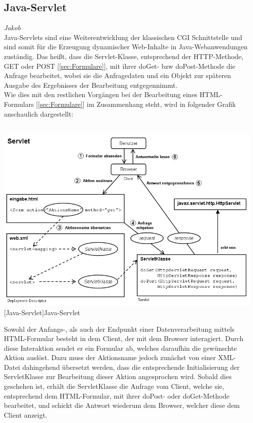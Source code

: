 \documentclass[12pt,a4paper,bibliography=totocnumbered,listof=totocnumbered]{scrartcl}
\begin{document}
\vspace{1em}
\begin{minipage}{\linewidth}
\subsection{Java-Servlet}
\label{sec:Java-Servlet}
\emph{Jakob}\\
Java-Servlets sind eine Weiterentwicklung der klassischen CGI Schnittstelle und sind somit für die Erzeugung dynamischer Web-Inhalte in Java-Webanwendungen zuständig.
Das heißt, dass die Servlet-Klasse, entsprechend der HTTP-Methode, GET oder POST [\ref{sec:Formulare}], mit ihrer doGet- bzw doPost-Methode die Anfrage bearbeitet, wobei sie die Anfragedaten und ein Objekt zur späteren Ausgabe des Ergebnisses der Bearbeitung entgegennimmt.\cite{wiki/Servlet}\\
Wie dies mit den restlichen Vorgängen bei der Bearbeitung eines HTML-Formulars [\ref{sec:Formulare}] im Zusammenhang steht, wird in folgender Grafik anschaulich dargestellt:\\
\\
\vspace{1em}
\begin{minipage}{\linewidth}
	\centering
	\includegraphics[width=0.9\linewidth]{Bilder/600px-Servlet.png}
	[Java-Servlet]{Java-Servlet\footnotemark }
	\label{fig:servlet}
\end{minipage}

Sowohl der Anfangs-, als auch der Endpunkt einer Datenverarbeitung mittels HTML-Formular besteht in dem Client, der mit dem Browser interagiert. Durch diese Interaktion sendet er ein Formular ab, welches daraufhin die gewünschte Aktion auslöst. Dazu muss der Aktionsname jedoch zunächst von einer XML-Datei dahingehend übersetzt werden, dass die entsprechende Initialisierung der ServletKlasse zur Bearbeitung dieser Aktion angesprochen wird.
Sobald dies geschehen ist, erhält die ServletKlasse die Anfrage vom Client, welche sie, entsprechend dem HTML-Formular, mit ihrer doPost- oder doGet-Methode bearbeitet, und schickt die Antwort wiederum dem Browser, welcher diese dem Client anzeigt.


\end{minipage}
\end{document}
